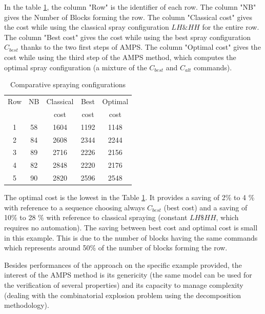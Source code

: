 \documentclass[preprint,3p,times,twocolumn]{elsarticle}
\begin{document}
In the table \ref{tb:CompCost}, the column "Row" is the identifier of each row. The column "NB" gives the Number of Blocks forming the row. The column "Classical cost" gives the cost while using the classical spray configuration $LH\&HH$ for the entire row. The column "Best cost" gives the cost while using the best spray configuration $C_{best}$ thanks to the two first steps of AMPS. The column "Optimal cost" gives the cost while using the third step of the AMPS method, which computes the optimal spray configuration (a mixture of the $C_{best}$ and $C_{alt}$ commands). %
\begin{table}[ht]
	\begin{center}
		\begin{tabular}{|c|c|c|c|c|}
			\hline 
			Row		& NB  		&	Classical   &	Best    &  Optimal      \\
			&   		&	 cost  &	 cost   &   cost     \\ \hline
			1		& 58		&   1604        	&	1192        &   1148           \\ \hline
			2		& 84		&	2608            &	2344        &   2244              \\ \hline
			3	    & 89	    &	2716        	&	2226        &   2156              \\ \hline
			4   	& 82    	&	2848            &	2220        &   2176            \\ \hline
			5	    & 90	    &	2820            &	2596        &   2548            \\ \hline
		\end{tabular} 
		\caption{Comparative spraying configurations}\label{tb:CompCost}
	\end{center}
\end{table}

The optimal cost is the lowest in the Table \ref{tb:CompCost}. It provides a saving of 2\% to 4 \% with reference to a sequence choosing always $C_{best}$ (best cost) and a saving of 10\% to 28 \% with reference to classical spraying (constant $LH\$HH$, which requires no automation). The saving between best cost and optimal cost is small in this example. This is due to the number of blocks having the same commands which represents around 50\% of the number of blocks forming the row.


Besides performances of the approach on the specific example provided, the interest of the AMPS method is its genericity (the same model can be used for the verification of several properties) and its capacity to manage complexity (dealing with the combinatorial explosion problem using the decomposition methodology). 
\end{document}
